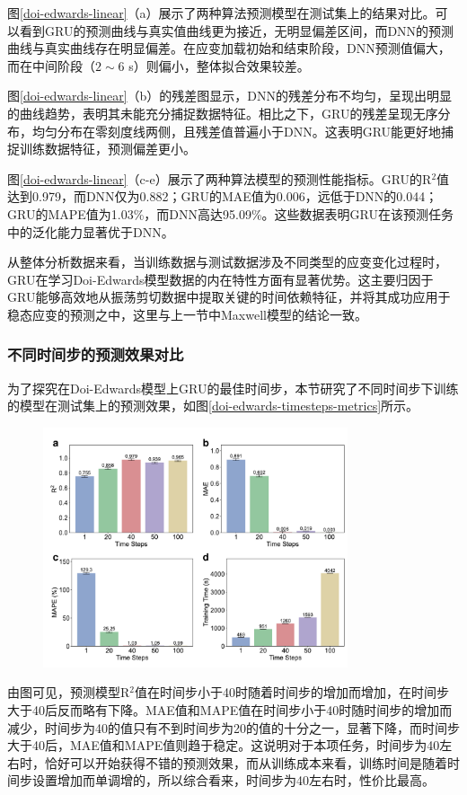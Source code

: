 图\ref{doi-edwards-linear}（a）展示了两种算法预测模型在测试集上的结果对比。可以看到GRU的预测曲线与真实值曲线更为接近，无明显偏差区间，而DNN的预测曲线与真实曲线存在明显偏差。在应变加载初始和结束阶段，DNN预测值偏大，而在中间阶段（$2\sim6$ s）则偏小，整体拟合效果较差。

图\ref{doi-edwards-linear}（b）的残差图显示，DNN的残差分布不均匀，呈现出明显的曲线趋势，表明其未能充分捕捉数据特征。相比之下，GRU的残差呈现无序分布，均匀分布在零刻度线两侧，且残差值普遍小于DNN。这表明GRU能更好地捕捉训练数据特征，预测偏差更小。

图\ref{doi-edwards-linear}（c-e）展示了两种算法模型的预测性能指标。GRU的R$^2$值达到0.979，而DNN仅为0.882；GRU的MAE值为0.006，远低于DNN的0.044；GRU的MAPE值为1.03\%，而DNN高达95.09\%。这些数据表明GRU在该预测任务中的泛化能力显著优于DNN。

从整体分析数据来看，当训练数据与测试数据涉及不同类型的应变变化过程时，GRU在学习Doi-Edwards模型数据的内在特性方面有显著优势。这主要归因于GRU能够高效地从振荡剪切数据中提取关键的时间依赖特征，并将其成功应用于稳态应变的预测之中，这里与上一节中Maxwell模型的结论一致。

\subsubsection{不同时间步的预测效果对比}
为了探究在Doi-Edwards模型上GRU的最佳时间步，本节研究了不同时间步下训练的模型在测试集上的预测效果，如图\ref{doi-edwards-timesteps-metrics}所示。
\begin{figure}[htbp]
  \centering
  \includegraphics[width=0.8\textwidth]{Fig/doi-edwards-timesteps-metrics.pdf}
\end{figure}
由图可见，预测模型R$^2$值在时间步小于40时随着时间步的增加而增加，在时间步大于40后反而略有下降。MAE值和MAPE值在时间步小于40时随时间步的增加而减少，时间步为40的值只有不到时间步为20的值的十分之一，显著下降，而时间步大于40后，MAE值和MAPE值则趋于稳定。这说明对于本项任务，时间步为40左右时，恰好可以开始获得不错的预测效果，而从训练成本来看，训练时间是随着时间步设置增加而单调增的，所以综合看来，时间步为40左右时，性价比最高。



